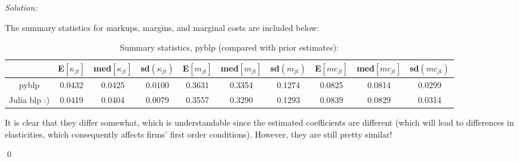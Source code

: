 \documentclass[12pt]{article}
\newenvironment{sol}
    {\emph{Solution:}
    }
    {
    \qed
    }
\begin{document}
\begin{sol}
The summary statistics for markups, margins, and marginal costs are included below:
\begin{center}
    \begin{table}[htbp]
        \centering
        \caption{Summary statistics, pyblp (compared with prior estimates):}
          \begin{tabular}{cccccccccc}
              \toprule
                 &E$[\kappa_{jt}]$ &med$[\kappa_{jt}]$ & sd$(\kappa_{jt})$ & E$[m_{jt}]$ &  med$[m_{jt}]$ & sd$(m_{jt})$& E$[mc_{jt}]$ &  med$[mc_{jt}]$ & sd$(mc_{jt})$   \\
              \midrule
                 pyblp&  0.0432 & 0.0425 & 0.0100& 0.3631&0.3354&0.1274&    0.0825 &0.0814 & 0.0299 \\
                 Julia blp :)&  0.0419 & 0.0404 & 0.0079& 0.3557&0.3290&0.1293&    0.0839 &0.0829 & 0.0314 \\
              \bottomrule
          \end{tabular}
        \label{tab:moments_pyblp}
      \end{table}
\end{center}
It is clear that they differ somewhat, which is understandable since the estimated coefficients are different (which will lead to differences in elasticities, which consequently affects firms' first order conditions). However, they are still pretty similar! 


\end{sol}
\end{document}
